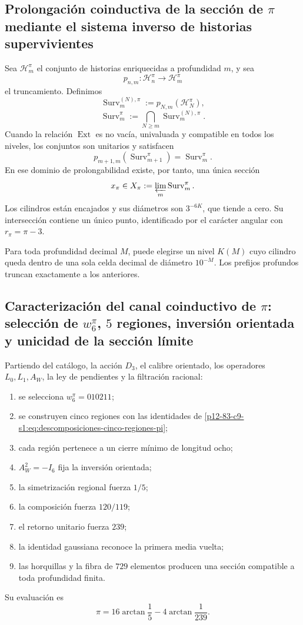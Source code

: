 \subsection{Prolongación coinductiva de la sección de \(\pi\) mediante el sistema inverso de historias supervivientes}

Sea \(\mathcal H_m^\pi\) el conjunto de historias enriquecidas a profundidad
\(m\), y sea
\[
 p_{n,m}:\mathcal H_n^\pi\longrightarrow\mathcal H_m^\pi
\]
el truncamiento. Definimos
\[
 \operatorname{Surv}_m^{(N),\pi}
 :=p_{N,m}(\mathcal H_N^\pi),
\]
\[
 \operatorname{Surv}_m^\pi
 :=\bigcap_{N\geq m}\operatorname{Surv}_m^{(N),\pi}.
\]
Cuando la relación \(\operatorname{Ext}\) es no vacía, univaluada y
compatible en todos los niveles, los conjuntos son unitarios y satisfacen
\[
 p_{m+1,m}(\operatorname{Surv}_{m+1}^{\pi})
 =\operatorname{Surv}_{m}^{\pi}.
\]
En ese dominio de prolongabilidad existe, por tanto, una única sección
\[
 x_\pi\in
 X_\pi:=\varprojlim_m\operatorname{Surv}_m^\pi.
\]
Los cilindros están encajados y sus diámetros son \(3^{-6K}\), que tiende a
cero. Su intersección contiene un único punto, identificado por el carácter
angular con \(r_\pi=\pi-3\).

Para toda profundidad decimal \(M\), puede elegirse un nivel \(K(M)\) cuyo
cilindro queda dentro de una sola celda decimal de diámetro \(10^{-M}\).
Los prefijos profundos truncan exactamente a los anteriores.

\subsection{Caracterización del canal coinductivo de \(\pi\): selección de \(w_6^\pi\), \(5\) regiones, inversión orientada y unicidad de la sección límite}

\begin{theorem}
\label{p12-83-c9-s1:thm:caracterizacion-final-pi-autonoma}
Partiendo del catálogo, la acción \(D_3\), el calibre orientado, los
operadores \(L_0,L_1,A_W\), la ley de pendientes y la filtración racional:
\begin{enumerate}
 \item se selecciona \(w_6^\pi=010211\);
 \item se construyen cinco regiones con las identidades de
       \eqref{p12-83-c9-s1:eq:descomposiciones-cinco-regiones-pi};
 \item cada región pertenece a un cierre mínimo de longitud ocho;
 \item \(A_W^2=-I_6\) fija la inversión orientada;
 \item la simetrización regional fuerza \(1/5\);
 \item la composición fuerza \(120/119\);
 \item el retorno unitario fuerza \(239\);
 \item la identidad gaussiana reconoce la primera media vuelta;
 \item las horquillas y la fibra de \(729\) elementos producen una sección
       compatible a toda profundidad finita.
\end{enumerate}
Su evaluación es
\[
 \boxed{\pi=16\arctan\frac15-4\arctan\frac1{239}.}
\]
\end{theorem}

